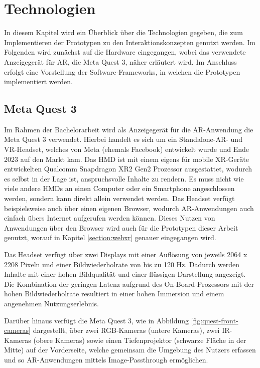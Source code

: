 \chapter{Technologien} %

In diesem Kapitel wird ein Überblick über die Technologien gegeben, die zum Implementieren der Prototypen zu den Interaktionskonzepten genutzt werden.
Im Folgenden wird zunächst auf die Hardware eingegangen, wobei das verwendete Anzeigegerät für AR, die Meta Quest 3, näher erläutert wird.
Im Anschluss erfolgt eine Vorstellung der Software-Frameworks, in welchen die Prototypen implementiert werden.

\section{Meta Quest 3}

Im Rahmen der Bachelorarbeit wird als Anzeigegerät für die AR-Anwendung die Meta Quest 3 verwendet.
Hierbei handelt es sich um ein Standalone-AR- und VR-Headset, welches von Meta (ehemals Facebook) entwickelt wurde und Ende 2023 auf den Markt kam.
Das HMD ist mit einem eigens für mobile XR-Geräte entwickelten Qualcomm Snapdragon XR2 Gen2 Prozessor ausgestattet, wodurch es selbst in der Lage ist, anspruchsvolle Inhalte zu rendern.
Es muss nicht wie viele andere HMDs an einen Computer oder ein Smartphone angeschlossen werden, sondern kann direkt allein verwendet werden.
Das Headset verfügt beispielsweise auch über einen eigenen Browser, wodurch AR-Anwendungen auch einfach übers Internet aufgerufen werden können.
Dieses Nutzen von Anwendungen über den Browser wird auch für die Prototypen dieser Arbeit genutzt, worauf in Kapitel \ref{section:webxr} genauer eingegangen wird.

Das Headset verfügt über zwei Displays mit einer Auflösung von jeweils 2064 x 2208 Pixeln und einer Bildwiederholrate von bis zu 120 Hz.
Dadurch werden Inhalte mit einer hohen Bildqualität und einer flüssigen Darstellung angezeigt.
Die Kombination der geringen Latenz aufgrund des On-Board-Prozessors mit der hohen Bildwiederholrate resultiert in einer hohen Immersion und einem angenehmen Nutzungserlebnis.

\newpage

Darüber hinaus verfügt die Meta Quest 3, wie in Abbildung \ref{fig:quest-front-cameras} dargestellt, über zwei RGB-Kameras (untere Kameras), zwei IR-Kameras (obere Kameras) sowie einen Tiefenprojektor (schwarze Fläche in der Mitte) auf der Vorderseite, welche gemeinsam die Umgebung des Nutzers erfassen und so AR-Anwendungen mittels Image-Passthrough ermöglichen.

